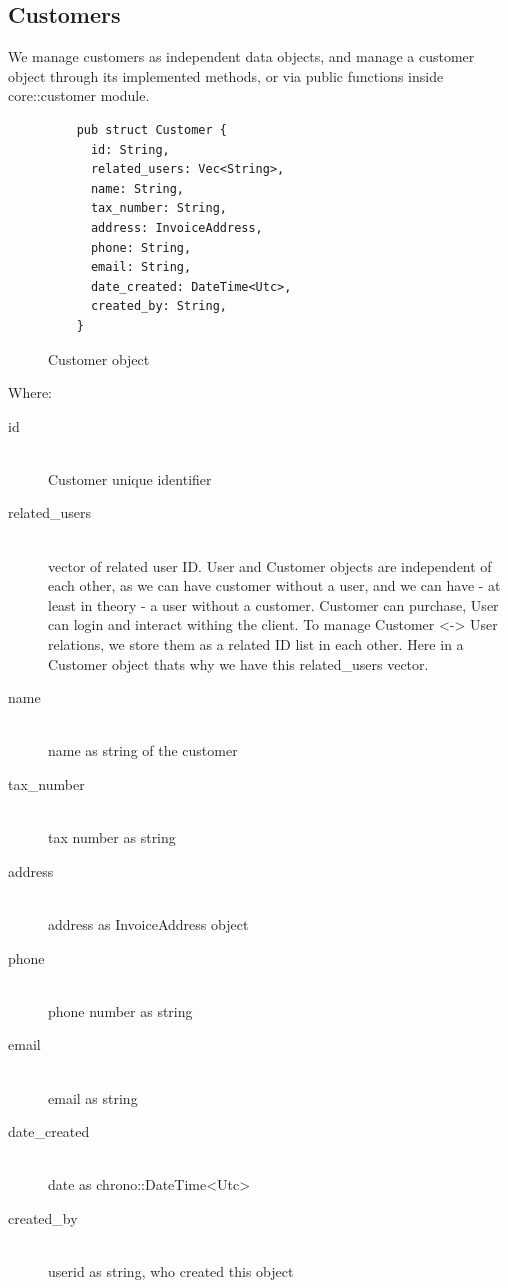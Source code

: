 \documentclass{article}
\begin{document}
\subsection{Customers}

We manage customers as independent data objects, and manage a customer
object through its implemented methods, or via public functions inside
core::customer module.

\begin{figure}[!htb]
  \caption{Customer object}
  \begin{verbatim}
    pub struct Customer {
      id: String,
      related_users: Vec<String>,
      name: String,
      tax_number: String,
      address: InvoiceAddress,
      phone: String,
      email: String,
      date_created: DateTime<Utc>,
      created_by: String,
    }
  \end{verbatim}
\end{figure}

Where:

\begin{description}
  \item[id] \hfill
    \\ Customer unique identifier 
  \item[related\_users] \hfill
    \\ vector of related user ID. User and Customer objects are independent
    of each other, as we can have customer without a user, and we can have
    - at least in theory - a user without a customer. Customer can
    purchase, User can login and interact withing the client. To manage
    Customer <-> User relations, we store them as a related ID list in
    each other. Here in a Customer object thats why we have this
    related\_users vector.

  \item[name] \hfill
    \\ name as string of the customer

  \item[tax\_number] \hfill
    \\ tax number as string
  \item[address] \hfill
    \\ address as InvoiceAddress object 
  \item[phone] \hfill
    \\ phone number as string
  \item[email] \hfill
    \\ email as string
  \item[date\_created] \hfill
    \\ date as chrono::DateTime<Utc>
  \item[created\_by] \hfill
    \\ userid as string, who created this object 
\end{description}
\end{document}
